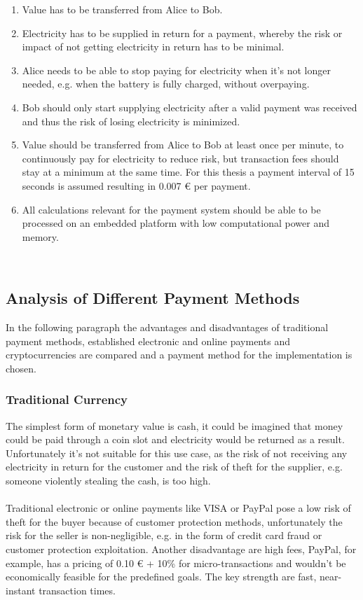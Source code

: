 \begin{enumerate}
    \item Value has to be transferred from Alice to Bob.
    \item Electricity has to be supplied in return for a payment, whereby the risk or impact of not getting electricity in return has to be minimal.
    \item Alice needs to be able to stop paying for electricity when it's not longer needed, e.g. when the battery is fully charged, without overpaying.
    \item Bob should only start supplying electricity after a valid payment was received and thus the risk of losing electricity is minimized.
    \item Value should be transferred from Alice to Bob at least once per minute, to continuously pay for electricity to reduce risk, but transaction fees should stay at a minimum at the same time.
    For this thesis a payment interval of 15 seconds is assumed resulting in 0.007 \euro{} per payment.
    \item All calculations relevant for the payment system should be able to be processed on an embedded platform with low computational power and memory.
\end{enumerate}
\leavevmode
\\
\subsection{Analysis of Different Payment Methods}
In the following paragraph the advantages and disadvantages of traditional payment methods, established electronic and online payments and cryptocurrencies are compared and a payment method for the implementation is chosen.
\\
\subsubsection{Traditional Currency}
The simplest form of monetary value is cash, it could be imagined that money could be paid through a coin slot and electricity would be returned as a result.
Unfortunately it's not suitable for this use case, as the risk of not receiving any electricity in return for the customer and the risk of theft for the supplier, e.g. someone violently stealing the cash, is too high.
\\\\
Traditional electronic or online payments like VISA or PayPal pose a low risk of theft for the buyer because of customer protection methods, unfortunately the risk for the seller is non-negligible, e.g. in the form of credit card fraud or customer protection exploitation.
Another disadvantage are high fees, PayPal, for example, has a pricing of 0.10 \euro{} + 10\% for micro-transactions\cite{paypal-fees} and wouldn't be economically feasible for the predefined goals.
The key strength are fast, near-instant transaction times.
\\
